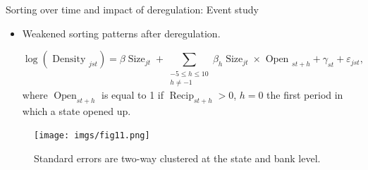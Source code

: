 \documentclass[notes,10pt, aspectratio=169]{beamer}
\begin{document}
        \begin{frame}{Sorting over time and impact of deregulation: Event study}
            \begin{itemize}
                \item Weakened sorting patterns after deregulation. %
    
            
            $$
            \log \left(\text { Density }_{j s t}\right)=\beta \operatorname{Size}_{j t}+\sum_{\substack{-5 \leq h \leq 10 \\ h \neq-1}} \beta_h \operatorname{Size}_{j t} \times \text { Open }_{s t+h}+\gamma_{s t}+\varepsilon_{j s t},
            $$
            where $\operatorname{Open}_{s t+h}$ is equal to 1 if $\operatorname{Recip}_{s t+h}>0$, $h=0$ the first period in which a state opened up.
        \end{itemize}
    
    \begin{figure}
        \centering
        \texttt{[image: imgs/fig11.png]}
        \label{fig:my_label}
        \caption*{Standard errors are two-way clustered at the state and bank level.}
    \end{figure}
    

\end{frame}
\end{document}
